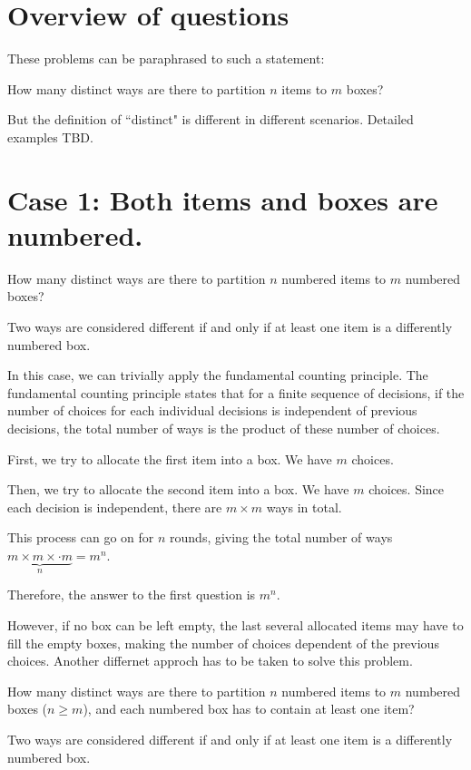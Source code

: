 \documentclass[a4paper]{article}
\begin{document}
\section{Overview of questions}

These problems can be paraphrased to such a statement:

\begin{tcolorbox}[title = Problem 0]
    How many distinct ways are there to partition $n$ items to $m$ boxes?
\end{tcolorbox}

But the definition of ``distinct" is different in different scenarios. Detailed examples TBD.

\section{Case 1: Both items and boxes are numbered.}

\begin{tcolorbox}[title = Problem 1.1]
    How many distinct ways are there to partition $n$ numbered items to $m$ numbered boxes? 

    Two ways are considered different if and only if at least one item is a differently numbered box. 
\end{tcolorbox}

In this case, we can trivially apply the fundamental counting principle. The fundamental counting principle states that for a finite sequence of decisions, if the number of choices for each individual decisions is independent of previous decisions, the total number of ways is the product of these number of choices.

First, we try to allocate the first item into a box. We have $m$ choices. 

Then, we try to allocate the second item into a box. We have $m$ choices. Since each decision is independent, there are $m \times m$ ways in total.

This process can go on for $n$ rounds, giving the total number of ways $\underbrace{m \times m \times \cdot m}_{n} = m^n$.

Therefore, the answer to the first question is $m^n$.

However, if no box can be left empty, the last several allocated items may have to fill the empty boxes, making the number of choices dependent of the previous choices. Another differnet approch has to be taken to solve this problem.

\begin{tcolorbox}[title = Problem 1.2]
    How many distinct ways are there to partition $n$ numbered items to $m$ numbered boxes ($n \ge m$), and each numbered box has to contain at least one item? 

    Two ways are considered different if and only if at least one item is a differently numbered box. 
\end{tcolorbox}
\end{document}
